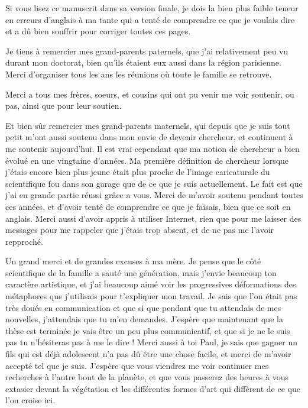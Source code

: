 \documentclass[A4paperpaper,11pt,english]{sphinxmanual}
\begin{document}
Si vous lisez ce manuscrit dans sa version finale, je dois la bien plus faible
teneur en erreurs d'anglais à ma tante qui a tenté de comprendre ce que je
voulais dire et a dû bien souffrir pour corriger toutes ces pages.

Je tiens à remercier mes grand-parents paternels, que j'ai relativement peu vu
durant mon doctorat, bien qu'ils étaient eux aussi dans la région parisienne.
Merci d'organiser tous les ans les réunions où toute le famille se retrouve.

Merci a tous mes frères, soeurs, et cousins qui ont pu venir me voir soutenir,
ou pas, ainsi que pour leur soutien.

Et bien sûr remercier mes grand-parents maternels, qui depuis que je suis tout
petit m'ont aussi soutenu dans mon envie de devenir chercheur, et continuent à me
soutenir aujourd'hui. Il est vrai cependant que ma notion de chercheur a bien
évolué en une vingtaine d'années. Ma première définition de chercheur lorsque
j'étais encore bien plus jeune était plus proche de l'image caricaturale du
scientifique fou dans son garage que de ce que je suis actuellement. Le fait
est que j'ai en grande partie réussi grâce a vous. Merci de m'avoir soutenu
pendant toutes ces années, et d'avoir tenté de comprendre ce que je faisais,
bien que ce soit en anglais. Merci aussi d'avoir appris à utiliser Internet,
rien que pour me laisser des messages pour me rappeler que j'étais trop absent,
et de ne pas me l'avoir repproché.

Un grand merci et de grandes excuses à ma mère. Je pense que le côté scientifique
de la famille a sauté une génération, mais j'envie beaucoup ton caractère
artistique, et j'ai beaucoup aimé voir les progressives déformations des
métaphores que j'utilisais pour t'expliquer mon travail. Je sais que l'on était
pas très doués en communication et que si que pendant que tu attendais de mes
nouvelles, j'attendais que tu m'en demandes. J'espère que maintenant que la
thèse est terminée je vais être un peu plus communicatif, et que si je ne le
suis pas tu n'hésiteras pas à me le dire ! Merci aussi à toi Paul, je sais que
gagner un fils qui est déjà adolescent n'a pas dû être une chose facile, et
merci de m'avoir accepté tel que je suis. J'espère que vous viendrez me voir
continuer mes recherches à l'autre bout de la planète, et que vous passerez des
heures à vous extasier devant la végétation et les différentes formes d'art qui
diffèrent de ce que l'on croise ici.
\end{document}

